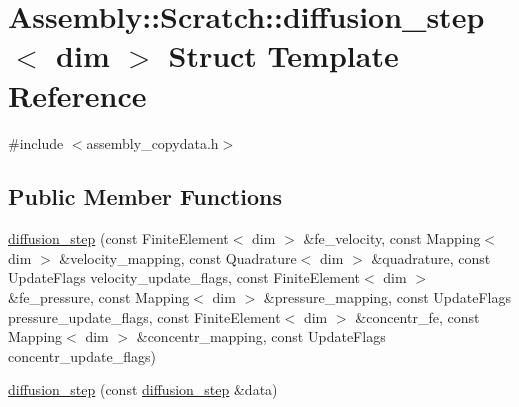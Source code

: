 \hypertarget{struct_assembly_1_1_scratch_1_1diffusion__step}{}\section{Assembly\+:\+:Scratch\+:\+:diffusion\+\_\+step$<$ dim $>$ Struct Template Reference}
\label{struct_assembly_1_1_scratch_1_1diffusion__step}


{\ttfamily \#include $<$assembly\+\_\+copydata.\+h$>$}

\subsection*{Public Member Functions}
\begin{DoxyCompactItemize}
\item 
\hyperlink{struct_assembly_1_1_scratch_1_1diffusion__step_a5769d06dbf6b99961da088f11f24cce3}{diffusion\+\_\+step} (const Finite\+Element$<$ dim $>$ \&fe\+\_\+velocity, const Mapping$<$ dim $>$ \&velocity\+\_\+mapping, const Quadrature$<$ dim $>$ \&quadrature, const Update\+Flags velocity\+\_\+update\+\_\+flags, const Finite\+Element$<$ dim $>$ \&fe\+\_\+pressure, const Mapping$<$ dim $>$ \&pressure\+\_\+mapping, const Update\+Flags pressure\+\_\+update\+\_\+flags, const Finite\+Element$<$ dim $>$ \&concentr\+\_\+fe, const Mapping$<$ dim $>$ \&concentr\+\_\+mapping, const Update\+Flags concentr\+\_\+update\+\_\+flags)
\item 
\hyperlink{struct_assembly_1_1_scratch_1_1diffusion__step_acd94c7791e03515bef5208066a1a0a26}{diffusion\+\_\+step} (const \hyperlink{struct_assembly_1_1_scratch_1_1diffusion__step}{diffusion\+\_\+step} \&data)
\end{DoxyCompactItemize}
